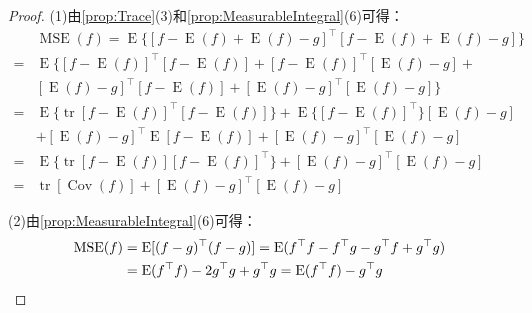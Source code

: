 \begin{proof}
	(1)由\cref{prop:Trace}(3)和\cref{prop:MeasurableIntegral}(6)可得：
	\begin{align*}
		&\operatorname{MSE}(f)=\operatorname{E}\{[f-\operatorname{E}(f)+\operatorname{E}(f)-g]^{\top}[f-\operatorname{E}(f)+\operatorname{E}(f)-g]\} \\
		=&\operatorname{E}\{[f-\operatorname{E}(f)]^{\top}[f-\operatorname{E}(f)]+[f-\operatorname{E}(f)]^{\top}[\operatorname{E}(f)-g]+ \\
		&[\operatorname{E}(f)-g]^{\top}[f-\operatorname{E}(f)]+[\operatorname{E}(f)-g]^{\top}[\operatorname{E}(f)-g]\} \\
		=&\operatorname{E}\{\operatorname{tr}[f-\operatorname{E}(f)]^{\top}[f-\operatorname{E}(f)]\}+\operatorname{E}\{[f-\operatorname{E}(f)]^{\top}\}[\operatorname{E}(f)-g] \\
		&+[\operatorname{E}(f)-g]^{\top}\operatorname{E}[f-\operatorname{E}(f)]+[\operatorname{E}(f)-g]^{\top}[\operatorname{E}(f)-g] \\
		=&\operatorname{E}\{\operatorname{tr}[f-\operatorname{E}(f)][f-\operatorname{E}(f)]^{\top}\}+[\operatorname{E}(f)-g]^{\top}[\operatorname{E}(f)-g] \\
		=&\operatorname{tr}[\operatorname{Cov}(f)]+[\operatorname{E}(f)-g]^{\top}[\operatorname{E}(f)-g]
	\end{align*}\par
	(2)由\cref{prop:MeasurableIntegral}(6)可得：
	\begin{align*}
		\operatorname{MSE}(f)&=\operatorname{E}[(f-g)^{\top}(f-g)]=\operatorname{E}(f^{\top}f-f^{\top}g-g^{\top}f+g^{\top}g) \\
		&=\operatorname{E}(f^{\top}f)-2g^{\top}g+g^{\top}g=\operatorname{E}(f^{\top}f)-g^{\top}g\qedhere
	\end{align*}
\end{proof}


